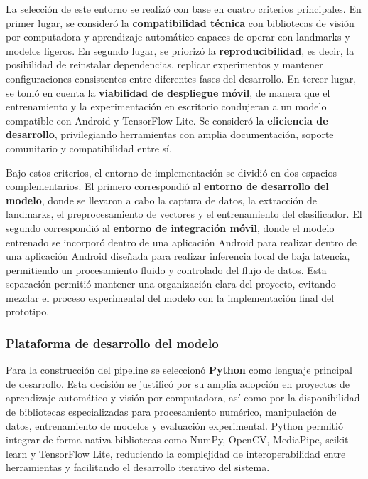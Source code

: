 	La selección de este entorno se realizó con base en cuatro criterios principales. En primer lugar, se consideró la \textbf{compatibilidad técnica} con bibliotecas de visión por computadora y aprendizaje automático capaces de operar con landmarks y modelos ligeros. En segundo lugar, se priorizó la \textbf{reproducibilidad}, es decir, la posibilidad de reinstalar dependencias, replicar experimentos y mantener configuraciones consistentes entre diferentes fases del desarrollo. En tercer lugar, se tomó en cuenta la \textbf{viabilidad de despliegue móvil}, de manera que el entrenamiento y la experimentación en escritorio condujeran a un modelo compatible con Android y TensorFlow Lite. Se consideró la \textbf{eficiencia de desarrollo}, privilegiando herramientas con amplia documentación, soporte comunitario y compatibilidad entre sí.
	
	Bajo estos criterios, el entorno de implementación se dividió en dos espacios complementarios. El primero correspondió al \textbf{entorno de desarrollo del modelo}, donde se llevaron a cabo la captura de datos, la extracción de landmarks, el preprocesamiento de vectores y el entrenamiento del clasificador. El segundo correspondió al \textbf{entorno de integración móvil}, donde el modelo entrenado se incorporó dentro de una aplicación Android para realizar dentro de una aplicación Android diseñada para realizar inferencia local de baja latencia, permitiendo un procesamiento fluido y controlado del flujo de datos. Esta separación permitió mantener una organización clara del proyecto, evitando mezclar el proceso experimental del modelo con la implementación final del prototipo.
	
	\subsubsection{Plataforma de desarrollo del modelo}
	
	Para la construcción del pipeline se seleccionó \textbf{Python} como lenguaje principal de desarrollo. Esta decisión se justificó por su amplia adopción en proyectos de aprendizaje automático y visión por computadora, así como por la disponibilidad de bibliotecas especializadas para procesamiento numérico, manipulación de datos, entrenamiento de modelos y evaluación experimental. Python permitió integrar de forma nativa bibliotecas como NumPy, OpenCV, MediaPipe, scikit-learn y TensorFlow Lite, reduciendo la complejidad de interoperabilidad entre herramientas y facilitando el desarrollo iterativo del sistema.
	
